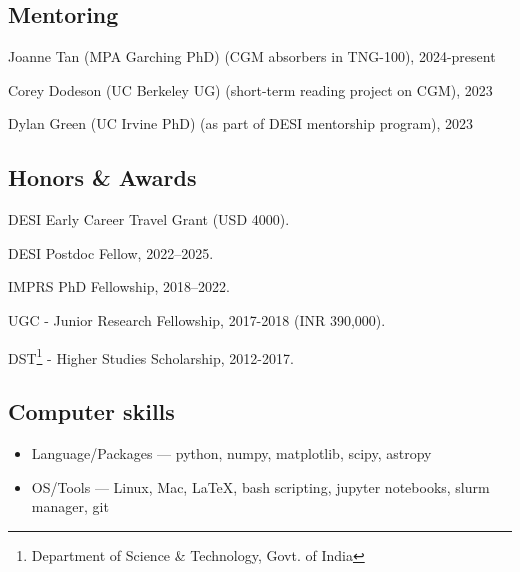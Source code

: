 \documentclass[12pt,letterpaper]{article}
\begin{document}
\subsection{Mentoring}
\begin{list}{}{\cvlist}
\item Joanne Tan (MPA Garching PhD) (CGM absorbers in TNG-100), 2024-present
\item Corey Dodeson (UC Berkeley UG) (short-term reading project on CGM), 2023
\item Dylan Green (UC Irvine PhD) (as part of DESI mentorship program), 2023
\end{list}

\subsection{Honors \& Awards}
\begin{list}{}{\cvlist}
  \item DESI Early Career Travel Grant (USD 4000).
  \item DESI Postdoc Fellow, 2022--2025.
  \item IMPRS PhD Fellowship, 2018--2022.
  \item UGC - Junior Research Fellowship, 2017-2018 (INR 390,000).
  \item DST\footnote{Department of Science \& Technology, Govt. of India} - Higher Studies Scholarship, 2012-2017.

\end{list}

\subsection{Computer skills}
\begin{list}{}{\cvlist}
\begin{itemize}
\item[] Language/Packages ---
    python, numpy, matplotlib, scipy, astropy
\item[] OS/Tools --- Linux, Mac, \LaTeX, bash scripting, jupyter notebooks, slurm manager, git
\end{itemize}
\end{list}
\end{document}
